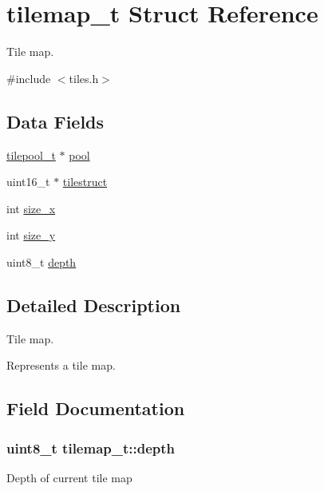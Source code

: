 \hypertarget{structtilemap__t}{}\section{tilemap\+\_\+t Struct Reference}
\label{structtilemap__t}


Tile map.  




{\ttfamily \#include $<$tiles.\+h$>$}

\subsection*{Data Fields}
\begin{DoxyCompactItemize}
\item 
\hyperlink{structtilepool__t}{tilepool\+\_\+t} $\ast$ \hyperlink{structtilemap__t_a4a251531ed02240ed1c0cbb50688cb14}{pool}
\item 
uint16\+\_\+t $\ast$ \hyperlink{structtilemap__t_aa8265d7200ace9d16f81dd5600958c34}{tilestruct}
\item 
int \hyperlink{structtilemap__t_a294a1064701b2f0d356919c24814a678}{size\+\_\+x}
\item 
int \hyperlink{structtilemap__t_a555e62b4a049be1c58a2bb7484bdf0c1}{size\+\_\+y}
\item 
uint8\+\_\+t \hyperlink{structtilemap__t_a567b661b0b1e30e9a84b25967b45db4b}{depth}
\end{DoxyCompactItemize}


\subsection{Detailed Description}
Tile map. 

Represents a tile map. 

\subsection{Field Documentation}
\subsubsection[{\texorpdfstring{depth}{depth}}]{\setlength{\rightskip}{0pt plus 5cm}uint8\+\_\+t tilemap\+\_\+t\+::depth}\hypertarget{structtilemap__t_a567b661b0b1e30e9a84b25967b45db4b}{}\label{structtilemap__t_a567b661b0b1e30e9a84b25967b45db4b}
Depth of current tile map 
